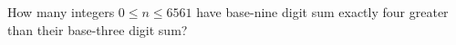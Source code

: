 How many integers $0\le n\le6561$ have base-nine digit sum exactly four greater than their base-three digit sum?

